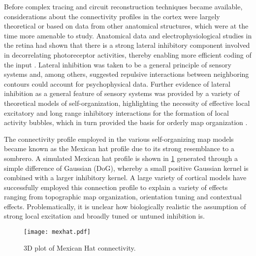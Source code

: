 Before complex tracing and circuit reconstruction techniques became
available, considerations about the connectivity profiles in the
cortex were largely theoretical or based on data from other anatomical
structures, which were at the time more amenable to study. Anatomical
data and electrophysiological studies in the retina had shown that
there is a strong lateral inhibitory component involved in
decorrelating photoreceptor activities, thereby enabling more
efficient coding of the input \citep{Atick1992}. Lateral inhibition
was taken to be a general principle of sensory systems and, among
others, \cite{Blakemore1970} suggested repulsive interactions between
neighboring contours could account for psychophysical data. Further
evidence of lateral inhibition as a general feature of sensory systems
was provided by a variety of theoretical models of self-organization,
highlighting the necessity of effective local excitatory and long
range inhibitory interactions for the formation of local activity
bubbles, which in turn provided the basis for orderly map organization
\citep{VonderMalsburg1973,Miller1989}.

The connectivity profile employed in the various self-organizing map
models became known as the Mexican hat profile due to its strong
resemblance to a sombrero. A simulated Mexican hat profile is shown in
\ref{MexHat} generated through a simple difference of Gaussian (DoG),
whereby a small positive Gaussian kernel is combined with a larger
inhibitory kernel. A large variety of cortical models have
successfully employed this connection profile to explain a variety of
effects ranging from topographic map organization, orientation tuning
and contextual effects. Problematically, it is unclear how
biologically realistic the assumption of strong local excitation and
broadly tuned or untuned inhibition is.

\begin{figure}
	\centering \texttt{[image: mexhat.pdf]}
	\caption{3D plot of
        Mexican Hat connectivity.}
	\label{MexHat}
\end{figure}

